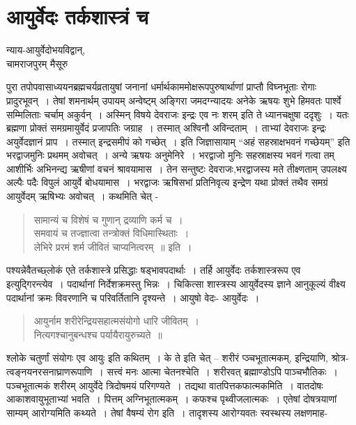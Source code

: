 {\fontsize{15}{17}\selectfont
\chapter{आयुर्वेदः तर्कशास्त्रं च}

\begin{center}
\smallskip

न्याय-आयुर्वेदोभयविद्वान्,\\
चामराजपुरम् मैसूरु
\addrule
\end{center}

पुरा तपोपवासाध्ययनब्रह्मचर्यव्रतायुषां जनानां धर्मार्थकाममोक्षरूपपुरुषार्थाणां प्राप्तौ विघ्नभूताः रोगाः प्रादुरभूवन्~। तेषां शमनार्थम् उपायम् अन्वेष्ट्म् अङ्गिरा जमदग्न्यादयः अनेके ऋषयः शुभे हिमवतः पार्श्वे सम्मिलिताः चर्चाम् अकुर्वन्~। अस्मिन् विषये देवराजः इन्द्रः एव नः शरम् इति ते ध्यानचक्षुषा ददृशुः~। यतः ब्रह्मणा प्रोक्तं समग्रमायुर्वेदं प्रजापतिः जग्राह~। तस्मात् अश्विनौ अविन्दताम्~। ताभ्यां देवराजः इन्द्रः अयुर्वेदज्ञानं प्राप~। तस्मात् इन्द्रसमीपं को गच्छेत्~। इति जिज्ञासायाम् “अहं सहस्राक्षभवनं गच्छेयम्” इति भरद्वाजमुनिः प्रथमम् अवोचत्~। अन्ये ऋषयः अनुमेनिरे~। भरद्वाजो मुनिः सहस्राक्षस्य भवनं गत्वा तम् आशीर्भिः अभिनन्द्य ऋषीणां वचनं श्रावयामास~। तेन सन्तुष्टः देवराजः,भरद्वाजस्य मते तीक्ष्णताम् उपलक्ष्य अल्पैः पदैः विपुलं आयुर्वे बोधयामास~। भरद्वाजः ऋषिसभां प्रतिनिवृत्य इन्द्रेण यथा प्रोक्तं तथैव समग्रं आयुर्वेदम् ऋषिभ्यः अवोचत्~। कथमिति चेत् -
\begin{verse}
सामान्यं च विशेषं च गुणान् द्रव्याणि कर्म च~। \\
समवायं च तज्ज्ञात्वा तन्त्रोक्तं विधिमास्थिताः~। \\
लेभिरे प्ररमं शर्म जीवितं चाप्यनित्वरम्~॥ इति~। 
\end{verse}
पश्यन्नेवैतच्छ्लोकं एते तर्कशास्त्रे प्रसिद्धाः षड्भावपदार्थाः~। तर्हि आयुर्वेदः तर्कशास्त्ररूप एव इत्युद्गिरन्त्येव~। पदार्थानां निर्देशक्रमस्तु भिन्नः~। चिकित्सा शास्त्रस्य आयुर्वेदस्य ज्ञाने आनुकूल्यं वीक्ष्य पदार्थानां क्रमः विवरणानि च परिवर्तितानि दृश्यन्ते~। आयुषो वेदः- आयुर्वेदः~। 
\begin{verse}
आयुर्नाम शरीरेन्द्रियसहात्मसंयोगो धारि जीवितम्~। \\
नित्यगश्चानुबन्धश्च पर्यायैरायुरुच्यते~॥
\end{verse}
श्लोके चतुर्णां संयोगः एव आयुः इति कथितम्~। के ते इति चेत् – शरीरं प्ञ्चभूतात्मकम्, इन्द्रियाणि, श्रोत्र-त्वङ्नयनरसनाघ्राणरूपाणि~। सत्त्वं मनः आत्मा चेतनश्चेति~। शरीरवत् ब्रह्माण्डोऽपि पाञ्चभौतिकः~। पञ्चभूतात्मकं शरीरम् आयुर्वेदे त्रिदोषमयं परिगण्यते~। तद्यथा वातपित्तकफात्मकमिति~। वातदोषः आकाशवायुभूताभ्यां भवति~। पित्तम् अग्निभूतात्मकम्~। कफश्च पृथ्वीजलात्मकः~। एतेषां दोषत्रयाणां साम्यम् आरोग्यमिति कथ्यते~। तेषां वैषम्यं रोग इति~। तादृशस्य आरोग्यवतः स्वस्थस्य लक्षणमाह-
}
